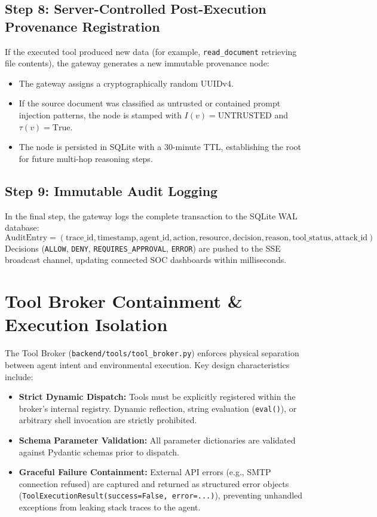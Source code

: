 \subsection{Step 8: Server-Controlled Post-Execution Provenance Registration}
If the executed tool produced new data (for example, \texttt{read\_document} retrieving file contents), the gateway generates a new immutable provenance node:
\begin{itemize}
    \item The gateway assigns a cryptographically random UUIDv4.
    \item If the source document was classified as untrusted or contained prompt injection patterns, the node is stamped with $I(v) = \text{UNTRUSTED}$ and $\tau(v) = \text{True}$.
    \item The node is persisted in SQLite with a 30-minute TTL, establishing the root for future multi-hop reasoning steps.
\end{itemize}

\subsection{Step 9: Immutable Audit Logging}
In the final step, the gateway logs the complete transaction to the SQLite WAL database:
\begin{equation}
\text{AuditEntry} = (\text{trace\_id}, \text{timestamp}, \text{agent\_id}, \text{action}, \text{resource}, \text{decision}, \text{reason}, \text{tool\_status}, \text{attack\_id})
\end{equation}
Decisions (\texttt{ALLOW}, \texttt{DENY}, \texttt{REQUIRES\_APPROVAL}, \texttt{ERROR}) are pushed to the SSE broadcast channel, updating connected SOC dashboards within milliseconds.

\section{Tool Broker Containment \& Execution Isolation}
The Tool Broker (\texttt{backend/tools/tool\_broker.py}) enforces physical separation between agent intent and environmental execution. Key design characteristics include:
\begin{itemize}
    \item \textbf{Strict Dynamic Dispatch:} Tools must be explicitly registered within the broker's internal registry. Dynamic reflection, string evaluation (\texttt{eval()}), or arbitrary shell invocation are strictly prohibited.
    \item \textbf{Schema Parameter Validation:} All parameter dictionaries are validated against Pydantic schemas prior to dispatch.
    \item \textbf{Graceful Failure Containment:} External API errors (e.g., SMTP connection refused) are captured and returned as structured error objects (\texttt{ToolExecutionResult(success=False, error=...)}), preventing unhandled exceptions from leaking stack traces to the agent.
\end{itemize}
